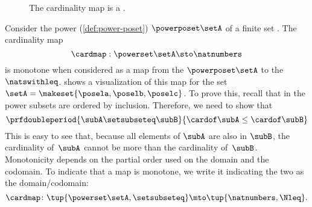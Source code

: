 \begin{figure*}[b]
    \centering
    \caption{The cardinality map is a . }
    \label{fig:cardinality}
\end{figure*}

\begin{example}\label{exa:cardinality}
    Consider the power  (\cref{def:power-poset}) $\powerposet\setA$ of a finite set \setA.
    The cardinality map
    \begin{equation}\label{eq:cardinality-map}
        \cardmap : \powerset\setA \sto \natnumbers
    \end{equation}
    is monotone when considered as a map from the  $\powerposet\setA$ to the  $\natswithleq$.
     shows a visualization of this map for the set~$\setA=\makeset{\posela,\poselb,\poselc}$.
    To prove this, recall that in the power  subsets are ordered by inclusion.
    Therefore, we need to show that
    \begin{equation}\label{eq:cardinality}
        \prfdoubleperiod{
            \subA \setsubseteq \subB
        }{
            \cardof \subA \leq \cardof \subB
        }
    \end{equation}
    This is easy to see that, because all elements of $\subA$ are also in $\subB$, the cardinality of~$\subA$ cannot be more than the cardinality of~$\subB$.
    Monotonicity depends on the partial order used on the domain and the codomain.
    To indicate that a map is monotone, we write it indicating the two  as the domain/codomain:
    \begin{equation}\label{eq:cardinality-as-posmap}
        \cardmap \colon \tup{\powerset\setA, \setsubseteq} \mto \tup{\natnumbers, {{\Nleq}}}.
    \end{equation}
\end{example}

